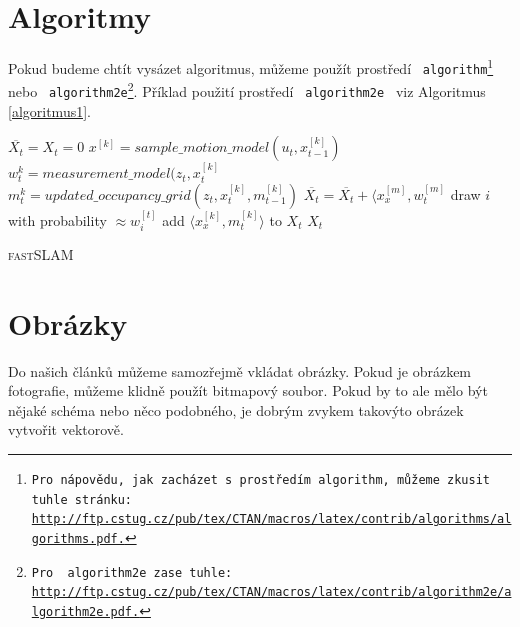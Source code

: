 \documentclass[a4paper, 11pt]{article}
\begin{document}
\section{Algoritmy}\label{3}

Pokud budeme chtít vysázet algoritmus, můžeme použít prostředí \texttt{ algorithm\footnote{Pro nápovědu, jak zacházet s prostředím \texttt{algorithm}, můžeme zkusit tuhle stránku: \\
\hyperlink{http://ftp.cstug.cz/pub/tex/CTAN/macros/latex/contrib/algorithms/algorithms.pdf}{http://ftp.cstug.cz/pub/tex/CTAN/macros/latex/contrib/algorithms/algorithms.pdf.} }} nebo \texttt{ algorithm2e\footnote{Pro \texttt{ algorithm2e} zase tuhle: \hyperlink{http://ftp.cstug.cz/pub/tex/CTAN/macros/latex/contrib/algorithm2e/algorithm2e.pdf}{http://ftp.cstug.cz/pub/tex/CTAN/macros/latex/contrib/algorithm2e/algorithm2e.pdf.} }}.
Příklad použití prostředí \texttt{ algorithm2e } viz Algoritmus \ref{algoritmus1}.

\begin{algorithm}
    \begin{algorithmic}[1]
        \STATE $\overline{X_t} = X_t = 0$
        \STATE $x^{[k]} = sample\_motion\_model(u_t,x^{[k]}_{t-1})$
        \STATE $w^{k}_t = measurement\_model(z_t,x_t^{[k]}$
        \STATE $m^{k}_t = updated\_occupancy\_grid(z_t,x_t^{[k]},m_{t-1}^{[k]})$
        \STATE $\overline{X_t} = \overline{X_t} + \langle x_x^{[m]},w_t^{[m]}$
        \ENDFOR
        \STATE draw $i$ with probability $\approx w_i^{[t]}$
        \STATE add $\langle x_x^{[k]},m_t^{[k]}\rangle$ to $X_t$
        \ENDFOR
        \RETURN $X_t$
    \end{algorithmic}
    \caption{\textsc{fast}SLAM}
    \label{algoritmus1}
\end{algorithm}


\section{Obrázky}\label{4}
Do našich článků můžeme samozřejmě vkládat obrázky. Pokud je obrázkem fotografie,
můžeme klidně použít bitmapový soubor. Pokud by to ale mělo být nějaké schéma nebo
něco podobného, je dobrým zvykem takovýto obrázek vytvořit vektorově.
\end{document}
